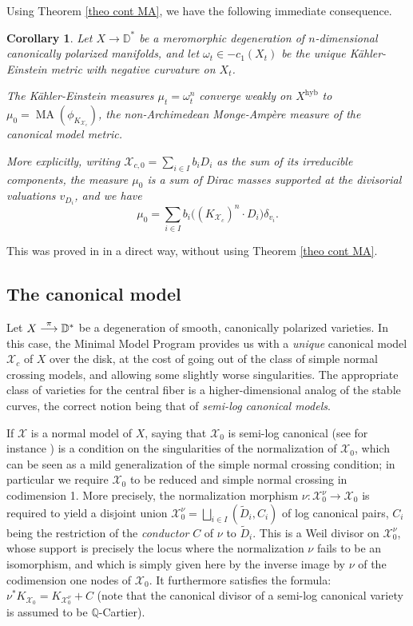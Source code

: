 \documentclass[JEP,XML,SOM,Unicode,published]{cedram}
\newcommand{\To}[1]{\mathchoice{\xrightarrow{\textstyle\kern4pt#1\kern3pt}}{\stackrel{#1}{\longrightarrow}}{}{}}
\newtheorem{cor}[equation]{Corollary}
\theoremstyle{definition}
\newcommand \D {\mathbb{D}}
\newcommand \Q{\mathbb Q}
\newcommand \X {\mathscr{X}}
\newcommand{\hyb}{\mathrm{hyb}}
\DeclareMathOperator{\MA}{MA}
\begin{document}
Using Theorem \ref{theo cont MA}, we have the following immediate consequence.
\begin{cor}
Let $X \to \D^*$ be a meromorphic degeneration of $n$-dimensional canonically polarized manifolds, and let $\omega_t \in -c_1(X_t)$ be the unique Kähler-Einstein metric with negative curvature on $X_t$.

The Kähler-Einstein measures $\mu_t = \omega_t^n$ converge weakly on $X^{\hyb}$ to $\mu_0 = \MA(\phi_{K_{\X_c}})$, the non-Archimedean Monge-Ampère measure of the canonical model metric.

More explicitly, writing $\X_{c, 0} = \sum_{i \in I} b_i D_i$ as the sum of its irreducible components, the measure $\mu_0$ is a sum of Dirac masses supported at the divisorial valuations $v_{D_i}$, and we have
\[
\mu_0 = \sum_{i \in I} b_i\bigl((K_{\X_c})^n \cdot D_i \bigr) \delta_{v_i}.
\]
\end{cor}
This was proved in \cite[Th.\,A]{PS} in a direct way, without using Theorem \ref{theo cont MA}.
\subsection{The canonical model} \label{sec CV alg neg}
Let $X \To{\pi} \D^*$ be a degeneration of smooth, canonically polarized varieties. In this case, the Minimal Model Program provides us with a \emph{unique} canonical model $\X_c$ of $X$ over the disk, at the cost of going out of the class of simple normal crossing models, and allowing some slightly worse singularities. The appropriate class of varieties for the central fiber is a higher-dimensional analog of the stable curves, the correct notion being that of \emph{semi-log canonical models}.

If $\X$ is a normal model of $X$, saying that $\X_0$ is semi-log canonical (see for instance \cite{Kollar2013}) is a condition on the singularities of the normalization of $\X_0$, which can be seen as a mild generalization of the simple normal crossing condition; in particular we require $\X_0$ to be reduced and simple normal crossing in codimension 1. More precisely, the normalization morphism $\nu: \X^{\nu}_0 \to \X_0$ is required to yield a disjoint union $\X_0^{\nu} = \bigsqcup_{i \in I} (\tilde{D}_i , C_i)$ of log canonical pairs, $C_i$ being the restriction of the \emph{conductor} $C$ of $\nu$ to $\tilde{D}_i$. This is a Weil divisor on $\X_0^{\nu}$, whose support is precisely the locus where the normalization $\nu$ fails to be an isomorphism, and which is simply given here by the inverse image by $\nu$ of the codimension one nodes of $\X_0$. It furthermore satisfies the formula: $\nu^*K_{\X_0} = K_{\X^{\nu}_0} + C$ (note that the canonical divisor of a semi-log canonical variety is assumed to be $\Q$-Cartier).
\end{document}
